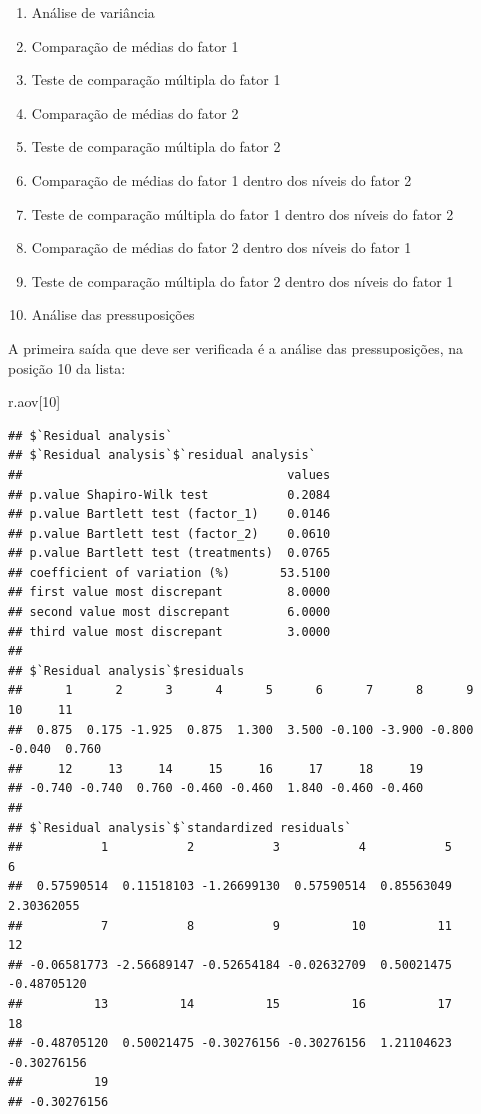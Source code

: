 \documentclass[
]{article}
\newenvironment{Shaded}{\begin{snugshade}}{\end{snugshade}}
\newcommand{\DecValTok}[1]{\textcolor[rgb]{0.00,0.00,0.81}{#1}}
\newcommand{\NormalTok}[1]{#1}
\providecommand{\tightlist}{%
  \setlength{\itemsep}{0pt}\setlength{\parskip}{0pt}}
\begin{document}
\begin{enumerate}
\def\labelenumi{\arabic{enumi}.}
\tightlist
\item
  Análise de variância
\item
  Comparação de médias do fator 1
\item
  Teste de comparação múltipla do fator 1
\item
  Comparação de médias do fator 2\\
\item
  Teste de comparação múltipla do fator 2
\item
  Comparação de médias do fator 1 dentro dos níveis do fator 2
\item
  Teste de comparação múltipla do fator 1 dentro dos níveis do fator 2
\item
  Comparação de médias do fator 2 dentro dos níveis do fator 1
\item
  Teste de comparação múltipla do fator 2 dentro dos níveis do fator 1
\item
  Análise das pressuposições
\end{enumerate}

A primeira saída que deve ser verificada é a análise das pressuposições, na posição 10 da lista:

\begin{Shaded}
\begin{Highlighting}[]
\NormalTok{r.aov[}\DecValTok{10}\NormalTok{]}
\end{Highlighting}
\end{Shaded}

\begin{verbatim}
## $`Residual analysis`
## $`Residual analysis`$`residual analysis`
##                                     values
## p.value Shapiro-Wilk test           0.2084
## p.value Bartlett test (factor_1)    0.0146
## p.value Bartlett test (factor_2)    0.0610
## p.value Bartlett test (treatments)  0.0765
## coefficient of variation (%)       53.5100
## first value most discrepant         8.0000
## second value most discrepant        6.0000
## third value most discrepant         3.0000
## 
## $`Residual analysis`$residuals
##      1      2      3      4      5      6      7      8      9     10     11 
##  0.875  0.175 -1.925  0.875  1.300  3.500 -0.100 -3.900 -0.800 -0.040  0.760 
##     12     13     14     15     16     17     18     19 
## -0.740 -0.740  0.760 -0.460 -0.460  1.840 -0.460 -0.460 
## 
## $`Residual analysis`$`standardized residuals`
##           1           2           3           4           5           6 
##  0.57590514  0.11518103 -1.26699130  0.57590514  0.85563049  2.30362055 
##           7           8           9          10          11          12 
## -0.06581773 -2.56689147 -0.52654184 -0.02632709  0.50021475 -0.48705120 
##          13          14          15          16          17          18 
## -0.48705120  0.50021475 -0.30276156 -0.30276156  1.21104623 -0.30276156 
##          19 
## -0.30276156
\end{verbatim}
\end{document}
